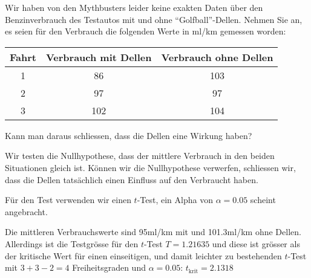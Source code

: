 Wir haben von den Mythbusters leider keine exakten Daten über den
Benzinverbrauch des Testautos mit und ohne ``Golfball''-Dellen.
Nehmen Sie an, es seien für den Verbrauch die folgenden Werte in ml/km
gemessen worden:
\begin{center}
\begin{tabular}{ccc}
\hline
Fahrt&Verbrauch mit Dellen&Verbrauch ohne Dellen\\
\hline
1&86&103\\
2&97&97\\
3&102&104\\
\hline
\end{tabular}
\end{center}
Kann man daraus schliessen, dass die Dellen eine Wirkung haben?


\begin{loesung}
Wir testen die Nullhypothese, dass der mittlere Verbrauch in den
beiden Situationen gleich ist.
Können wir die Nullhypothese verwerfen, schliessen wir, dass die
Dellen tatsächlich einen Einfluss auf den Verbraucht haben.

Für den Test verwenden wir einen $t$-Test, ein Alpha von
$\alpha=0.05$ scheint angebracht.

Die mittleren Verbrauchswerte sind 95ml/km mit und 101.3ml/km ohne
Dellen.
Allerdings ist die Testgrösse für den $t$-Test
$T=1.21635$ und diese ist grösser als der kritische Wert für
einen einseitigen, und damit leichter zu bestehenden $t$-Test mit
$3+3-2=4$ Freiheitsgraden und
$\alpha=0.05$: $t_{\text{krit}}=2.1318$
\end{loesung}

